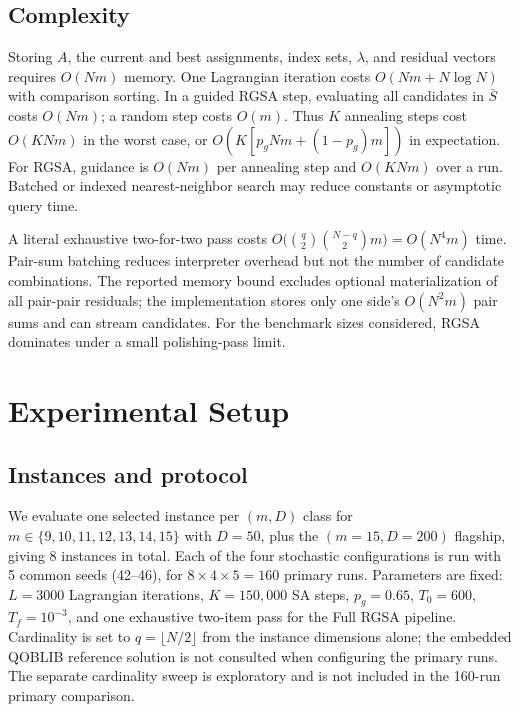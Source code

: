 \documentclass[11pt]{article}
\begin{document}
\subsection{Complexity}
Storing $A$, the current and best assignments, index sets, $\lambda$, and residual vectors requires $O(Nm)$ memory. One Lagrangian iteration costs $O(Nm+N\log N)$ with comparison sorting. In a guided RGSA step, evaluating all candidates in $\bar S$ costs $O(Nm)$; a random step costs $O(m)$. Thus $K$ annealing steps cost $O(KNm)$ in the worst case, or $O(K[p_gNm+(1-p_g)m])$ in expectation. For RGSA, guidance is $O(Nm)$ per annealing step and $O(KNm)$ over a run. Batched or indexed nearest-neighbor search may reduce constants or asymptotic query time.

A literal exhaustive two-for-two pass costs
$O\bigl(\binom{q}{2}\binom{N-q}{2}m\bigr)=O(N^4m)$ time. Pair-sum batching reduces interpreter overhead but not the number of candidate combinations. The reported memory bound excludes optional materialization of all pair-pair residuals; the implementation stores only one side's $O(N^2m)$ pair sums and can stream candidates. For the benchmark sizes considered, RGSA dominates under a small polishing-pass limit.

\section{Experimental Setup}\label{sec:setup}
\subsection{Instances and protocol}
We evaluate one selected instance per $(m,D)$ class for $m\in\{9,10,11,12,13,14,15\}$ with $D=50$, plus the $(m{=}15,D{=}200)$ flagship, giving 8 instances in total. Each of the four stochastic configurations is run with 5 common seeds (42--46), for $8\times4\times5=160$ primary runs. Parameters are fixed: $L=3000$ Lagrangian iterations, $K=150{,}000$ SA steps, $p_g=0.65$, $T_0=600$, $T_f=10^{-3}$, and one exhaustive two-item pass for the Full RGSA pipeline. Cardinality is set to $q=\lfloor N/2\rfloor$ from the instance dimensions alone; the embedded QOBLIB reference solution is not consulted when configuring the primary runs. The separate cardinality sweep is exploratory and is not included in the 160-run primary comparison.
\end{document}
